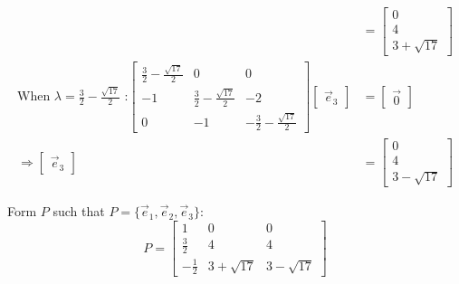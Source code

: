 \documentclass[11pt]{homework}
\begin{document}
\begin{align*}
  &=
  \begin{bmatrix}
    0 \\
    4 \\
    3 + \sqrt{17}
  \end{bmatrix} \\
\text{When $\lambda = \frac{3}{2} - \frac{\sqrt{17}}{2}$ :}
  \begin{bmatrix}
    \frac{3}{2} - \frac{\sqrt{17}}{2} & 0 & 0 \\
    -1 &  \frac{3}{2} - \frac{\sqrt{17}}{2} & -2 \\
    0  & -1 & -\frac{3}{2} - \frac{\sqrt{17}}{2}
  \end{bmatrix}
  \begin{bmatrix}
    \vec e_3
  \end{bmatrix}
  &=
  \begin{bmatrix}
    \vec 0
  \end{bmatrix} \\
\Rightarrow
  \begin{bmatrix}
    \vec e_3
  \end{bmatrix}
  &=
  \begin{bmatrix}
    0 \\
    4 \\
    3 - \sqrt{17}
  \end{bmatrix}
\end{align*}

Form $P$ such that $P=\{\vec e_1, \vec e_2, \vec e_3\}$:
\begin{equation*}
  P =
  \begin{bmatrix}
    1            & 0             & 0             \\
    \frac{3}{2}  & 4             & 4             \\
    -\frac{1}{2} & 3 + \sqrt{17} & 3 - \sqrt{17}
  \end{bmatrix}
\end{equation*}
\end{document}
